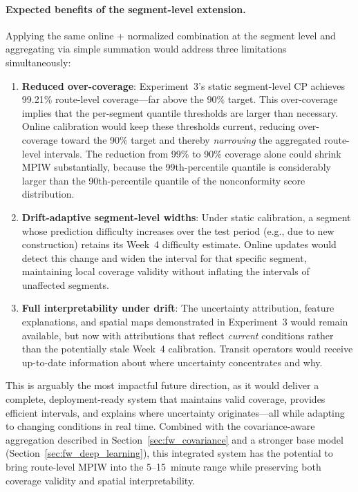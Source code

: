 \paragraph{Expected benefits of the segment-level extension.} Applying the same online + normalized combination at the segment level and aggregating via simple summation would address three limitations simultaneously:
\begin{enumerate}
    \item \textbf{Reduced over-coverage}: Experiment~3's static segment-level CP achieves 99.21\% route-level coverage---far above the 90\% target. This over-coverage implies that the per-segment quantile thresholds are larger than necessary. Online calibration would keep these thresholds current, reducing over-coverage toward the 90\% target and thereby \emph{narrowing} the aggregated route-level intervals. The reduction from 99\% to 90\% coverage alone could shrink MPIW substantially, because the 99th-percentile quantile is considerably larger than the 90th-percentile quantile of the nonconformity score distribution.
    \item \textbf{Drift-adaptive segment-level widths}: Under static calibration, a segment whose prediction difficulty increases over the test period (e.g., due to new construction) retains its Week~4 difficulty estimate. Online updates would detect this change and widen the interval for that specific segment, maintaining local coverage validity without inflating the intervals of unaffected segments.
    \item \textbf{Full interpretability under drift}: The uncertainty attribution, feature explanations, and spatial maps demonstrated in Experiment~3 would remain available, but now with attributions that reflect \emph{current} conditions rather than the potentially stale Week~4 calibration. Transit operators would receive up-to-date information about where uncertainty concentrates and why.
\end{enumerate}

This is arguably the most impactful future direction, as it would deliver a complete, deployment-ready system that maintains valid coverage, provides efficient intervals, and explains where uncertainty originates---all while adapting to changing conditions in real time. Combined with the covariance-aware aggregation described in Section~\ref{sec:fw_covariance} and a stronger base model (Section~\ref{sec:fw_deep_learning}), this integrated system has the potential to bring route-level MPIW into the 5--15~minute range while preserving both coverage validity and spatial interpretability.